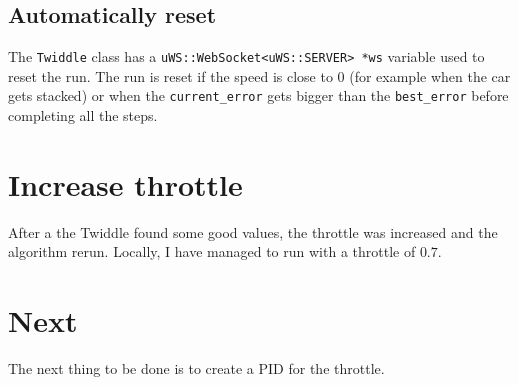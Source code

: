 \documentclass{article}
\let\cd\lstinline
\begin{document}
\subsection{Automatically reset}
The \cd+Twiddle+ class has a  \cd+uWS::WebSocket<uWS::SERVER> *ws+ variable used to reset the run. The run is reset if the speed is close to $0$ (for example when the car gets stacked) or when the \cd+current_error+ gets bigger than the \cd+best_error+ before completing all the steps.

\section{Increase throttle}
After a the Twiddle found some good values, the throttle was increased and the algorithm rerun. Locally, I have managed to run with a throttle of $0.7$.

\section{Next}
The next thing to be done is to create a PID for the throttle.
\end{document}
